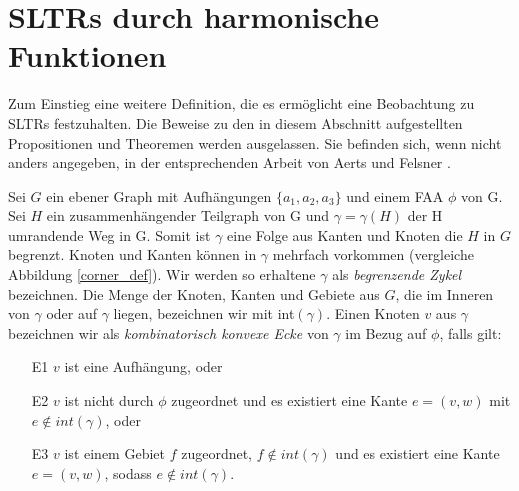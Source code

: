 \section{SLTRs durch harmonische Funktionen}\label{harmonic_approach}

Zum Einstieg eine weitere Definition, die es ermöglicht eine Beobachtung zu SLTRs festzuhalten. Die Beweise zu den in diesem Abschnitt aufgestellten Propositionen und Theoremen werden ausgelassen. Sie befinden sich, wenn nicht anders angegeben, in der entsprechenden Arbeit von Aerts und Felsner \cite{af13}.

\begin{definition}\label{def_cyc_cor}
Sei $G$ ein ebener Graph mit Aufhängungen $\{a_1,a_2,a_3\}$ und einem FAA $\phi$ von G. Sei $H$ ein zusammenhängender Teilgraph von G und $\gamma=\gamma(H)$ der H umrandende Weg in G. Somit ist $\gamma$ eine Folge aus Kanten und Knoten die $H$ in $G$ begrenzt. Knoten und Kanten können in $\gamma$ mehrfach vorkommen (vergleiche Abbildung \ref{corner_def}). Wir werden so erhaltene $\gamma$ als \textit{begrenzende Zykel} bezeichnen. Die Menge der Knoten, Kanten und Gebiete aus $G$, die im Inneren von $\gamma$ oder auf $\gamma$ liegen, bezeichnen wir mit int$(\gamma)$. Einen Knoten $v$ aus $\gamma$ bezeichnen wir als \textit{kombinatorisch konvexe Ecke} von $\gamma$ im Bezug auf $\phi$, falls gilt:
\begin{itemize}
\item [E1] $v$ ist eine Aufhängung, oder
\item [E2] $v$ ist nicht durch $\phi$ zugeordnet und es existiert eine Kante $e = (v,w)$ mit $e \notin int(\gamma)$, oder
\item [E3] $v$ ist einem Gebiet $f$ zugeordnet, $f \notin int(\gamma)$ und es existiert eine Kante $e = (v,w)$, sodass $e \notin int(\gamma)$.
\end{itemize}
\end{definition}

